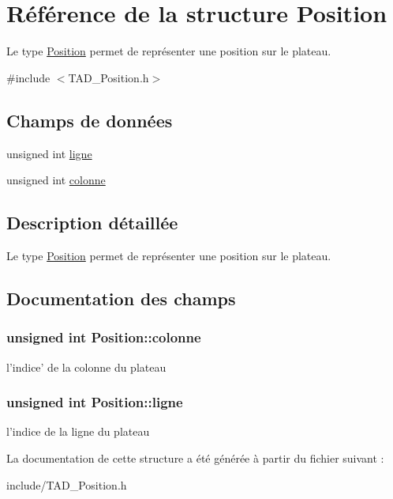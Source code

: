 \hypertarget{structPosition}{\section{Référence de la structure Position}
\label{structPosition}
}


Le type \hyperlink{structPosition}{Position} permet de représenter une position sur le plateau.  




{\ttfamily \#include $<$T\-A\-D\-\_\-\-Position.\-h$>$}

\subsection*{Champs de données}
\begin{DoxyCompactItemize}
\item 
unsigned int \hyperlink{structPosition_a0c539d474eeb3d627a65e19af2d36e08}{ligne}
\item 
unsigned int \hyperlink{structPosition_a66392cca8222d344ec19a7b576f4ab31}{colonne}
\end{DoxyCompactItemize}


\subsection{Description détaillée}
Le type \hyperlink{structPosition}{Position} permet de représenter une position sur le plateau. 

\subsection{Documentation des champs}
\hypertarget{structPosition_a66392cca8222d344ec19a7b576f4ab31}{
\subsubsection[{colonne}]{\setlength{\rightskip}{0pt plus 5cm}unsigned int Position\-::colonne}}\label{structPosition_a66392cca8222d344ec19a7b576f4ab31}
l'indice' de la colonne du plateau \hypertarget{structPosition_a0c539d474eeb3d627a65e19af2d36e08}{
\subsubsection[{ligne}]{\setlength{\rightskip}{0pt plus 5cm}unsigned int Position\-::ligne}}\label{structPosition_a0c539d474eeb3d627a65e19af2d36e08}
l'indice de la ligne du plateau 

La documentation de cette structure a été générée à partir du fichier suivant \-:\begin{DoxyCompactItemize}
\item 
include/T\-A\-D\-\_\-\-Position.\-h\end{DoxyCompactItemize}
